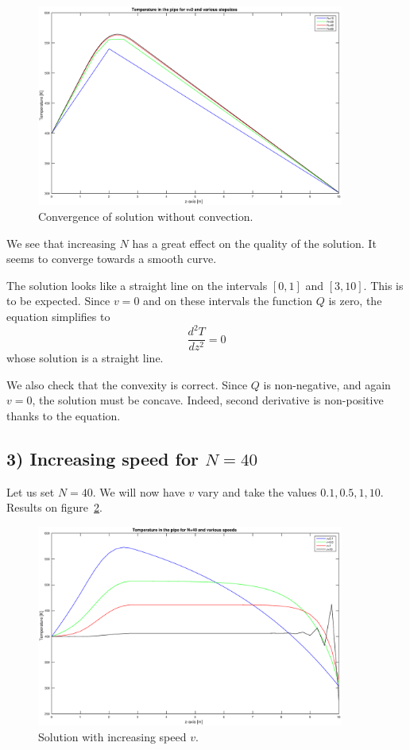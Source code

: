 \documentclass[11pt,a4paper]{report}
\begin{document}
\begin{figure}[!h]
\centering
\includegraphics[width = 0.9\textwidth]{./fig1.eps}
\caption{Convergence of solution without convection.}
\label{fig:1}
\end{figure}

We see that increasing $N$ has a great effect on the quality of the solution. It seems to converge towards a smooth curve.

The solution looks like a straight line on the intervals $[0,1]$ and $[3,10]$. This is to be expected. Since $v=0$ and on these intervals the function $Q$ is zero, the equation simplifies to $$\dfrac{d^{2}T}{dz^{2}}=0$$ whose solution is a straight line.

We also check that the convexity is correct. Since $Q$ is non-negative, and again $v=0$, the solution must be concave. Indeed, second derivative is non-positive thanks to the equation.

\subsection*{3) Increasing speed for $N=40$}

Let us set $N=40$. We will now have $v$ vary and take the values $0.1, 0.5, 1,10$. Results on figure~\ref{fig:2}.

\begin{figure}[!h]
\centering
\includegraphics[width = 0.9\textwidth]{./fig2.eps}
\caption{Solution with increasing speed $v$.}
\label{fig:2}
\end{figure}
\end{document}
